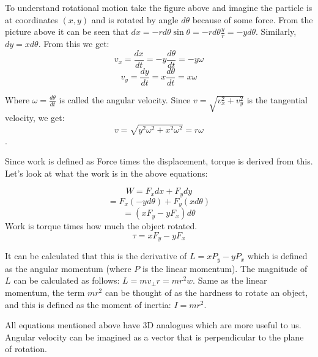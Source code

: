 \begin{center}
\end{center}

To understand rotational motion take the figure above and imagine the particle is at coordinates $(x, y)$ and is rotated by angle $d\theta$ because of some force. From the picture above it can be seen that $dx = -rd\theta\sin\theta = -rd\theta\frac{y}{r} = -yd\theta$. Similarly, $dy = xd\theta$. From this we get:
\[
v_x = \frac{dx}{dt} = -y\frac{d\theta}{dt} = -y\omega
\]
\[
v_y = \frac{dy}{dt} = x\frac{d\theta}{dt} = x\omega
\]

Where $\omega=\frac{d\theta}{dt}$ is called the angular velocity. Since $v = \sqrt{v_x^2 + v_y^2}$ is the tangential velocity, we get:
\[
v = \sqrt{y^2\omega^2 + x^2\omega^2} = r\omega
\].

Since work is defined as Force times the displacement, torque is derived from this. Let's look at what the work is in the above equations:

\[ 
W = F_xdx + F_ydy
\]
\[ 
= F_x(-yd\theta) + F_y(xd\theta)
\]
\[ 
= (xF_y - yF_x)d\theta
\]
Work is torque times how much the object rotated. 
\[
\tau = xF_y - yF_x
\]

It can be calculated that this is the derivative of $L = xP_y - yP_x$ which is defined as the angular momentum (where $P$ is the linear momentum). The magnitude of $L$ can be calculated as follows: $L = mv_{\perp}r = mr^2w$. Same as the linear momentum, the term $mr^2$ can be thought of as the hardness to rotate an object, and this is defined as the moment of inertia: $I = mr^2$.

All equations mentioned above have 3D analogues which are more useful to us. Angular velocity can be imagined as a vector that is perpendicular to the plane of rotation.

